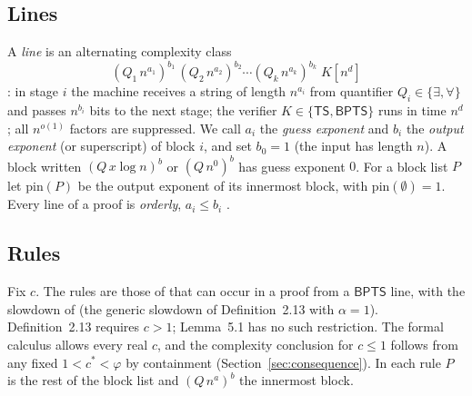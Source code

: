 \documentclass[11pt]{article}
\theoremstyle{definition}
\newcommand{\TS}{\mathsf{TS}}
\newcommand{\BPTS}{\mathsf{BPTS}}
\newcommand{\pin}{\mathrm{pin}}
\begin{document}
\subsection{Lines}

A \emph{line} is an alternating complexity class
\[
(Q_1\,n^{a_1})^{b_1}\,(Q_2\,n^{a_2})^{b_2}\cdots(Q_k\,n^{a_k})^{b_k}\;K[n^{d}]
\]
\cite[Definition~2.5]{MW21}: in stage $i$ the machine receives a string of length $n^{a_i}$ from quantifier $Q_i\in\{\exists,\forall\}$ and passes $n^{b_i}$ bits to the next stage; the verifier $K\in\{\TS,\BPTS\}$ runs in time $n^{d}$; all $n^{o(1)}$ factors are suppressed. We call $a_i$ the \emph{guess exponent} and $b_i$ the \emph{output exponent} (or superscript) of block $i$, and set $b_0=1$ (the input has length $n$). A block written $(Q\,x\log n)^b$ or $(Q\,n^0)^b$ has guess exponent $0$. For a block list $P$ let $\pin(P)$ be the output exponent of its innermost block, with $\pin(\emptyset)=1$. Every line of a proof is \emph{orderly}, $a_i\le b_i$ \cite[Lemma~2.17]{MW21}.

\subsection{Rules}\label{sec:rules}

Fix $c$. The rules are those of \cite[Definition~2.14]{MW21} that can occur in a proof from a $\BPTS$ line, with the slowdown of \cite[Lemma~5.1]{MW21} (the generic slowdown of Definition~2.13 with $\alpha=1$). Definition~2.13 requires $c>1$; Lemma~5.1 has no such restriction. The formal calculus allows every real $c$, and the complexity conclusion for $c\le1$ follows from any fixed $1<c^*<\varphi$ by containment (Section~\ref{sec:consequence}). In each rule $P$ is the rest of the block list and $(Q\,n^{a})^{b}$ the innermost block.
\end{document}
